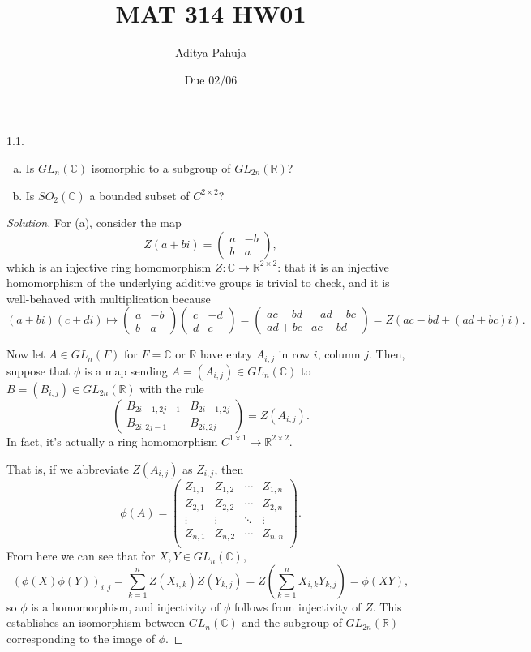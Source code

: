 \documentclass[11pt]{scrartcl}
\title{\vspace{-2em}MAT 314 HW01}
\author{\large Aditya Pahuja}
\date{\large Due 02/06}
\providecommand{\CC}{\mathbb C}
\providecommand{\RR}{\mathbb R}
\providecommand{\ii}{\item}
\newenvironment{soln}{\begin{proof}[Solution]}{\end{proof}}
\begin{document}
\maketitle

\begin{problem*}1.1.
	\begin{enumerate}[(a)]
		\ii Is $GL_n(\CC)$ isomorphic to a subgroup of $GL_{2n}(\RR)$?
		\ii Is $SO_2(\CC)$ a bounded subset of $C^{2\times 2}$?
	\end{enumerate}
\end{problem*}

\begin{soln}
	For (a), consider the map
	\[Z(a + bi) = \begin{pmatrix}
		a&-b\\b&a
	\end{pmatrix},\]
	which is an injective ring homomorphism
	$Z\colon \CC\to\RR^{2\times 2}$:
	that it is an injective homomorphism of the underlying additive groups
	is trivial to check, and it is well-behaved with multiplication because
	\[(a+bi)(c+di)\mapsto \begin{pmatrix}
		a&-b\\b&a
	\end{pmatrix}\begin{pmatrix}
		c&-d\\d&c
	\end{pmatrix}
	= \begin{pmatrix}
		ac-bd&-ad-bc\\ad+bc&ac-bd
	\end{pmatrix} = Z(ac-bd + (ad+bc)i).\]
	
	Now let $A\in GL_n(F)$ for $F = \CC$ or $\RR$
	have entry $A_{i,j}$ in row $i$, column $j$.
	Then, suppose that $\phi$ is a map sending $A = (A_{i,j})\in GL_n(\CC)$
	to $B = (B_{i,j})\in GL_{2n}(\RR)$ with the rule
	\[\begin{pmatrix}
		B_{2i-1,2j-1}&B_{2i-1,2j}\\
		B_{2i,2j-1}&B_{2i,2j}
	\end{pmatrix} = Z(A_{i,j}).\]
	In fact, it's actually a ring homomorphism
	$C^{1\times 1}\to \RR^{2\times 2}$.
	
	That is, if we abbreviate $Z(A_{i,j})$ as $Z_{i,j}$, then
	\[\phi(A) = \begin{pmatrix}
		Z_{1,1} & Z_{1,2} & \cdots & Z_{1,n}\\
		Z_{2,1} & Z_{2,2} & \cdots & Z_{2,n}\\
		\vdots & \vdots & \ddots & \vdots\\
		Z_{n,1} & Z_{n,2} & \cdots & Z_{n,n}\\
	\end{pmatrix}.\]
	From here we can see that for $X,Y\in GL_n(\CC)$,
	\[(\phi(X)\phi(Y))_{i,j} = \sum_{k=1}^n Z(X_{i,k})Z(Y_{k,j})
	= Z\left(\sum_{k=1}^n X_{i,k}Y_{k,j}\right)
	= \phi(XY),
	\]
	so $\phi$ is a homomorphism, and injectivity of $\phi$ follows from
	injectivity of $Z$. This establishes an isomorphism between
	$GL_n(\CC)$ and the subgroup of $GL_{2n}(\RR)$ corresponding to
	the image of $\phi$.
	

\end{soln}
\end{document}
